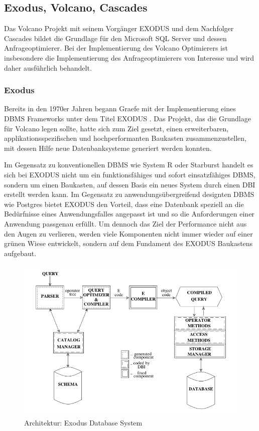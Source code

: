\subsection{Exodus, Volcano, Cascades}

Das Volcano Projekt mit seinem Vorgänger EXODUS und dem Nachfolger Cascades bildet die Grundlage für den Microsoft SQL Server und dessen Anfrageoptimierer. Bei der Implementierung des Volcano Optimierers ist insbesondere die Implementierung des Anfrageoptimierers von Interesse und wird daher ausführlich behandelt.

\subsubsection{Exodus}


Bereits in den 1970er Jahren begann Graefe mit der Implementierung eines DBMS Frameworks unter dem Titel EXODUS \cite{carey1990exodus}.  Das Projekt, das die Grundlage für Volcano legen sollte, hatte sich zum Ziel gesetzt, einen erweiterbaren, applikationsspezifischen und hochperformanten Baukasten zusammenzustellen, mit dessen Hilfe neue Datenbanksysteme generiert werden konnten. 

Im Gegensatz zu konventionellen DBMS wie System R oder Starburst handelt es sich bei EXODUS nicht um ein funktionsfähiges und sofort einsatzfähiges DBMS, sondern um einen Baukasten, auf dessen Basis ein neues System durch einen \ac{DBI} erstellt werden kann. Im Gegensatz zu anwendungsübergreifend designten DBMS wie Postgres bietet EXODUS den Vorteil, dass eine Datenbank speziell an die Bedürfnisse eines Anwendungsfalles angepasst ist und so die Anforderungen einer Anwendung passgenau erfüllt. Um dennoch das Ziel der Performance nicht aus den Augen zu verlieren, werden viele Komponenten nicht immer wieder auf einer grünen Wiese entwickelt, sondern auf dem Fundament des EXODUS Baukastens aufgebaut.

\begin{figure}[ht]
  \centering
  \includegraphics[width=\textwidth]{02_Related_Work/ExodusDatabaseSystemStructure.png}
  \caption{Architektur: Exodus Database System}
  \label{ExodusDatabaseStructure}
\end{figure}

